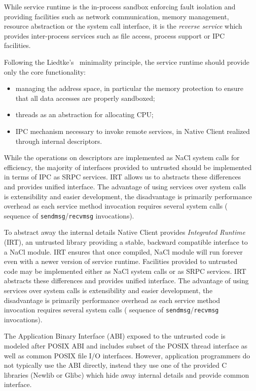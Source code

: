 While service runtime is the in-process sandbox enforcing fault
isolation and providing facilities such as network communication, memory
management, resource abstraction or the system call interface, it is the
\emph{reverse service} which provides inter-process services such as
file access, process support or IPC facilities.

Following the Liedtke's~\cite{liedtke:sosp93} minimality principle, the
service runtime should provide only the core functionality:
\begin{itemize}
\item managing the address space, in particular the memory protection to
	ensure that all data accesses are properly sandboxed; 
\item threads as an abstraction for allocating CPU;
\item IPC mechanism necessary to invoke remote services, in Native
	Client realized through internal descriptors.
\end{itemize}

While the operations on descriptors are implemented as NaCl system calls
for efficiency, the majority of interfaces provided to untrusted should
be implemented in terms of IPC as SRPC services. IRT allows us to
abstracts these differences and provides unified interface. The
advantage of using services over system calls is extensibility and
easier development, the disadvantage is primarily performance overhead
as each service method invocation requires several system calls (\ie
sequence of \lstinline`sendmsg`/\lstinline`recvmsg` invocations).

To abstract away the internal details Native Client provides
\emph{Integrated Runtime} (IRT), an untrusted library providing a
stable, backward compatible interface to a NaCl module. IRT ensures that
once compiled, NaCl module will run forever even with a newer version of
service runtime. Facilities provided to untrusted code may be
implemented either as NaCl system calls or as SRPC services. IRT
abstracts these differences and provides unified interface. The
advantage of using services over system calls is extensibility and
easier development, the disadvantage is primarily performance overhead
as each service method invocation requires several system calls (\ie
sequence of \lstinline`sendmsg`/\lstinline`recvmsg` invocations).

The Application Binary Interface (ABI) exposed to the untrusted code is
modeled after POSIX ABI and includes subset of the POSIX thread
interface as well as common POSIX file I/O interfaces.  However,
application programmers do not typically use the ABI directly, instead
they use one of the provided C libraries (\ie Newlib or Glibc) which hide
away internal details and provide common interface.



